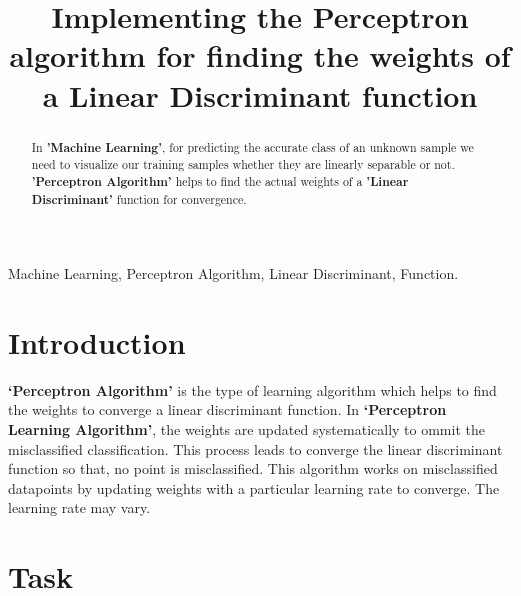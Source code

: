 \documentclass[conference]{IEEEtran}
\begin{document}
\title{Implementing the Perceptron algorithm for finding the
weights of a Linear Discriminant function\\
}

\author{

}

\maketitle

\begin{abstract}
In \textbf{'Machine Learning'}, for predicting the accurate class of an unknown sample we need to visualize our training samples whether they are linearly separable or not. \textbf{'Perceptron Algorithm'} helps to find the actual weights of a \textbf{'Linear Discriminant'} function for convergence.
\end{abstract}

\begin{IEEEkeywords}
Machine Learning, Perceptron Algorithm, Linear Discriminant, Function.
\end{IEEEkeywords}

\section{Introduction}
\textbf{‘Perceptron Algorithm’} is the type of learning algorithm which helps to find the weights to converge a linear discriminant function. In \textbf{‘Perceptron Learning Algorithm’}, the weights are updated systematically to ommit the misclassified classification. This process leads to converge the linear discriminant function so that, no point is misclassified. This algorithm works on misclassified datapoints by updating weights with a particular learning rate to converge. The learning rate may vary. 


\section{Task}
\end{document}
